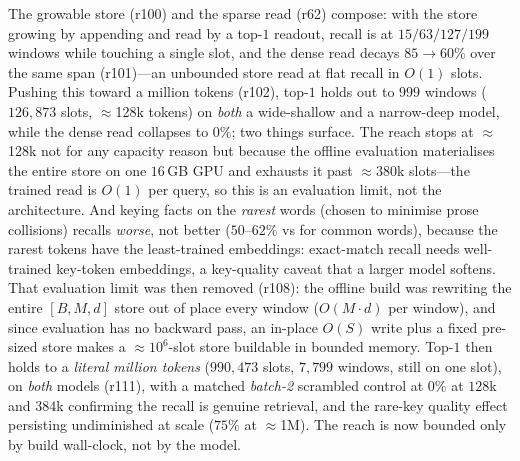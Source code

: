 The growable store (r100) and the sparse read (r62) compose: with the store growing by
appending and read by a top-$1$ readout, recall is  at $15/63/127/199$
windows while touching a single slot, and the dense read decays $85\to60\%$ over the same
span (r101)---an unbounded store read at flat recall in $O(1)$ slots. Pushing this toward
a million tokens (r102), top-$1$ holds  out to $999$ windows
($126{,}873$ slots, $\approx$128k tokens) on \emph{both} a wide-shallow and a
narrow-deep model, while the dense read collapses to $0\%$; two things surface. The reach
stops at $\approx$128k not for any capacity reason but because the offline evaluation
materialises the entire store on one $16$\,GB GPU and exhausts it past $\approx$$380$k
slots---the trained read is $O(1)$ per query, so this is an evaluation limit, not the
architecture. And keying facts on the \emph{rarest} words (chosen to minimise prose
collisions) recalls \emph{worse}, not better ($50$--$62\%$ vs  for common
words), because the rarest tokens have the least-trained embeddings: exact-match recall
needs well-trained key-token embeddings, a key-quality caveat that a larger model softens.
That evaluation limit was then removed (r108): the offline build was rewriting the entire
$[B,M,d]$ store out of place every window ($O(M\cdot d)$ per window), and since evaluation
has no backward pass, an in-place $O(S)$ write plus a fixed pre-sized store makes a
$\approx\!10^{6}$-slot store buildable in bounded memory. Top-$1$ then holds  to
a \emph{literal million tokens} ($990{,}473$ slots, $7{,}799$ windows, still on one slot),
on \emph{both} models (r111), with a matched \emph{batch-2} scrambled control at $0\%$ at
$128$k and $384$k confirming the recall is genuine retrieval, and the rare-key quality
effect persisting undiminished at scale ($75\%$ at $\approx$1M). The reach is now bounded
only by build wall-clock, not by the model.

